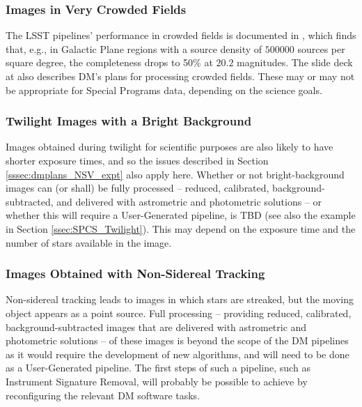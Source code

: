 \documentclass[DM,lsstdoc,toc]{lsstdoc}
\begin{document}

\subsubsection{Images in Very Crowded Fields}

The LSST pipelines' performance in crowded fields is documented in , which finds that, e.g., in Galactic Plane regions with a source density of $500000$ sources per square degree, the completeness drops to 50\% at $20.2$ magnitudes. The slide deck at  also describes DM's plans for processing crowded fields. These may or may not be appropriate for Special Programs data, depending on the science goals.

\subsubsection{Twilight Images with a Bright Background}

Images obtained during twilight for scientific purposes are also likely to have shorter exposure times, and so the issues described in Section \ref{sssec:dmplans_NSV_expt} also apply here. Whether or not bright-background images can (or shall) be fully processed -- reduced, calibrated, background-subtracted, and delivered with astrometric and photometric solutions -- or whether this will require a User-Generated pipeline, is TBD (see also the example in Section \ref{ssec:SPCS_Twilight}). This may depend on the exposure time and the number of stars available in the image.

\subsubsection{Images Obtained with Non-Sidereal Tracking}

Non-sidereal tracking leads to images in which stars are streaked, but the moving object appears as a point source. Full processing -- providing reduced, calibrated, background-subtracted images that are delivered with astrometric and photometric solutions -- of these images is beyond the scope of the DM pipelines as it would require the development of new algorithms, and will need to be done as a User-Generated pipeline. The first steps of such a pipeline, such as Instrument Signature Removal, will probably be possible to achieve by reconfiguring the relevant DM software tasks.
\end{document}
